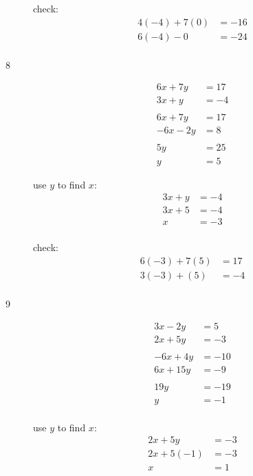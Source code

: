 \documentclass[fleqn,addpoints]{exam}
\begin{document}
\begin{description}
check:
\begin{align*}
  4(-4)+7(0) &= -16 \\
  6(-4)-0 &= -24 \\
\end{align*}

\item[8]
\begin{align*}
  6x+7y &= 17 \\
  3x+y &= -4 \\
  \\ 
  6x+7y &= 17 \\
  -6x - 2y &= 8 \\
  \\
  5y &= 25 \\
  y &= 5
\end{align*}

use $y$ to find $x$:
\begin{align*}
  3x+y &= -4 \\
  3x+5 &= -4 \\
  x &= -3 \\
\end{align*}

\vspace{0.2 cm}
\vspace{0.2 cm}

check:
\begin{align*}
  6(-3)+7(5) &= 17 \\
  3(-3)+(5) &= -4 \\
\end{align*}

\item[9]
\begin{align*}
  3x - 2y &= 5 \\
  2x+5y &= -3 \\
  \\
  -6x + 4y &= -10 \\
  6x + 15y &= -9 \\
  \\
  19y &= -19 \\
  y &= -1 \\
\end{align*}

use $y$ to find $x$:
\begin{align*}
  2x+5y &= -3 \\
  2x + 5(-1) &= -3 \\
  x &= 1 \\
\end{align*}


\end{description}
\end{document}
